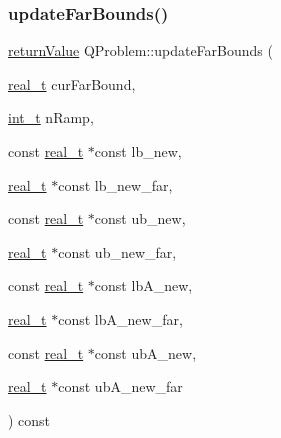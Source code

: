 \subsubsection{\texorpdfstring{update\+Far\+Bounds()}{updateFarBounds()}}
{\footnotesize\ttfamily \hyperlink{_message_handling_8hpp_a81d556f613bfbabd0b1f9488c0fa865e}{return\+Value} Q\+Problem\+::update\+Far\+Bounds (\begin{DoxyParamCaption}\item[{\hyperlink{qp_o_a_s_e_s__wrapper_8h_a0d00e2b3dfadee81331bbb39068570c4}{real\+\_\+t}}]{cur\+Far\+Bound,  }\item[{\hyperlink{_types_8hpp_ab6fd6105e64ed14a0c9281326f05e623}{int\+\_\+t}}]{n\+Ramp,  }\item[{const \hyperlink{qp_o_a_s_e_s__wrapper_8h_a0d00e2b3dfadee81331bbb39068570c4}{real\+\_\+t} $\ast$const}]{lb\+\_\+new,  }\item[{\hyperlink{qp_o_a_s_e_s__wrapper_8h_a0d00e2b3dfadee81331bbb39068570c4}{real\+\_\+t} $\ast$const}]{lb\+\_\+new\+\_\+far,  }\item[{const \hyperlink{qp_o_a_s_e_s__wrapper_8h_a0d00e2b3dfadee81331bbb39068570c4}{real\+\_\+t} $\ast$const}]{ub\+\_\+new,  }\item[{\hyperlink{qp_o_a_s_e_s__wrapper_8h_a0d00e2b3dfadee81331bbb39068570c4}{real\+\_\+t} $\ast$const}]{ub\+\_\+new\+\_\+far,  }\item[{const \hyperlink{qp_o_a_s_e_s__wrapper_8h_a0d00e2b3dfadee81331bbb39068570c4}{real\+\_\+t} $\ast$const}]{lb\+A\+\_\+new,  }\item[{\hyperlink{qp_o_a_s_e_s__wrapper_8h_a0d00e2b3dfadee81331bbb39068570c4}{real\+\_\+t} $\ast$const}]{lb\+A\+\_\+new\+\_\+far,  }\item[{const \hyperlink{qp_o_a_s_e_s__wrapper_8h_a0d00e2b3dfadee81331bbb39068570c4}{real\+\_\+t} $\ast$const}]{ub\+A\+\_\+new,  }\item[{\hyperlink{qp_o_a_s_e_s__wrapper_8h_a0d00e2b3dfadee81331bbb39068570c4}{real\+\_\+t} $\ast$const}]{ub\+A\+\_\+new\+\_\+far }\end{DoxyParamCaption}) const\hspace{0.3cm}{\ttfamily [protected]}}


